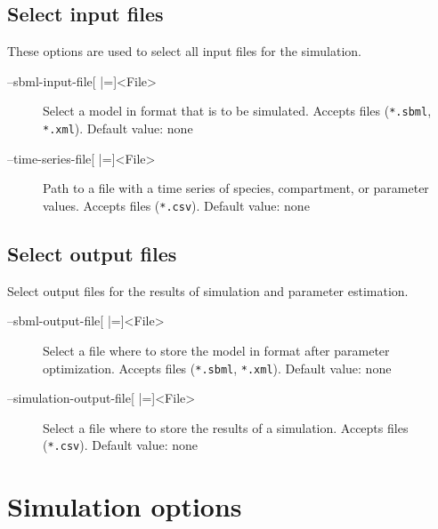 \subsection{Select input files}
These options are used to select all input files for the simulation.
\begin{description}
\item[--sbml-input-file{[} |={]}<File>]
          Select a model in \SBML format that is to be simulated. Accepts
          \SBML files (\texttt{*.sbml}, \texttt{*.xml}).
          Default value: none
\item[--time-series-file{[} |={]}<File>] Path to a file with a time series of
          species, compartment, or parameter
          values. Accepts \CSV files (\texttt{*.csv}).
          Default value: none
\end{description}

\subsection{Select output files}
Select output files for the results of simulation and parameter estimation.
\begin{description}
\item[--sbml-output-file{[} |={]}<File>]
          Select a file where to store the model in \SBML format after parameter
          optimization. Accepts \SBML files (\texttt{*.sbml}, \texttt{*.xml}).
          Default value: none

\item[--simulation-output-file{[} |={]}<File>]
          Select a file where to store the results of a simulation. Accepts
          \CSV files (\texttt{*.csv}).
          Default value: none
\end{description}

\section{Simulation options}
